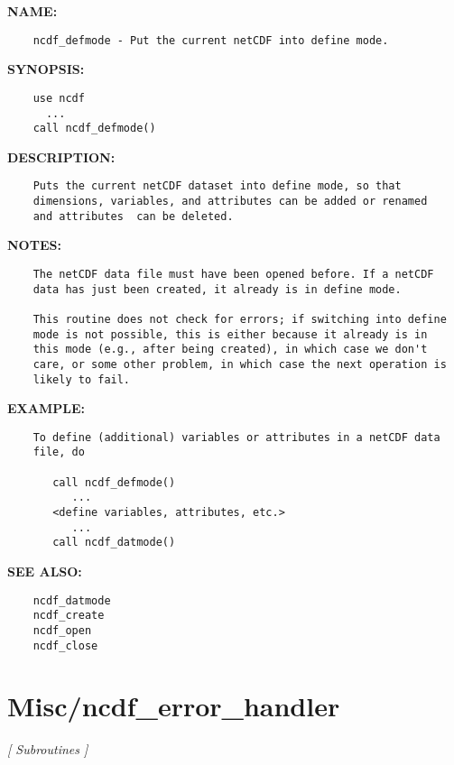 \label{ch:robo75}
\label{ch:Misc_ncdf_defmode}
\textbf{NAME:}\hspace{0.08in}\begin{Verbatim}
    ncdf_defmode - Put the current netCDF into define mode.
\end{Verbatim}
\textbf{SYNOPSIS:}\hspace{0.08in}\begin{Verbatim}
    use ncdf
      ...
    call ncdf_defmode()
\end{Verbatim}
\textbf{DESCRIPTION:}\hspace{0.08in}\begin{Verbatim}
    Puts the current netCDF dataset into define mode, so that
    dimensions, variables, and attributes can be added or renamed
    and attributes  can be deleted.
\end{Verbatim}
\textbf{NOTES:}\hspace{0.08in}\begin{Verbatim}
    The netCDF data file must have been opened before. If a netCDF
    data has just been created, it already is in define mode.

    This routine does not check for errors; if switching into define
    mode is not possible, this is either because it already is in
    this mode (e.g., after being created), in which case we don't
    care, or some other problem, in which case the next operation is
    likely to fail.
\end{Verbatim}
\textbf{EXAMPLE:}\hspace{0.08in}\begin{Verbatim}
    To define (additional) variables or attributes in a netCDF data
    file, do

       call ncdf_defmode()
          ...
       <define variables, attributes, etc.>
          ...
       call ncdf_datmode()
\end{Verbatim}
\textbf{SEE ALSO:}\hspace{0.08in}\begin{Verbatim}
    ncdf_datmode
    ncdf_create
    ncdf_open
    ncdf_close
\end{Verbatim}
\section{Misc/ncdf\_error\_handler}
\textsl{[ Subroutines ]}

